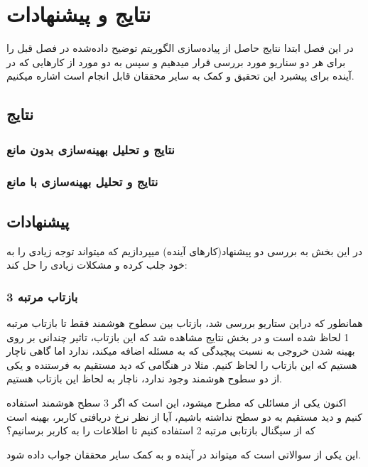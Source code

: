 \chapter{نتایج و پیشنهادات}
در این فصل ابتدا نتایج حاصل از پیاده‌سازی الگوریتم توضیح داده‌شده در فصل قبل را برای هر دو سناریو مورد بررسی قرار میدهیم و سپس به دو مورد از کارهایی که در آینده برای پیشبرد این تحقیق و کمک به سایر محققان قابل انجام است اشاره میکنیم.
\newpage
\section{نتایج}

\subsection{نتایج و تحلیل بهینه‌سازی بدون مانع}

\subsection{نتایج و تحلیل بهینه‌سازی با مانع}

\section{پیشنهادات}

در این بخش به بررسی دو پیشنهاد(کارهای آینده) میپردازیم که میتواند توجه زیادی را به خود جلب کرده و مشکلات زیادی را حل کند:

\subsection{بازتاب مرتبه 3}

همانطور که دراین ستاریو بررسی شد، بازتاب بین سطوح هوشمند فقط تا بازتاب مرتبه 1 لحاظ شده است و در بخش نتایج مشاهده شد که این بازتاب، تاثیر چندانی بر روی بهینه شدن خروجی به نسبت پیچیدگی که به مسئله اضافه میکند، ندارد اما گاهی ناچار هستیم که این بازتاب را لحاظ کنیم. مثلا در هنگامی که دید مستقیم به فرستنده و یکی از دو سطوح هوشمند وجود ندارد، ناچار به لحاظ این بازتاب هستیم. 

اکنون یکی از مسائلی که مطرح میشود، این است که اگر 3 سطح هوشمند استفاده کنیم و دید مستقیم به دو سطح نداشته باشیم، آیا از نظر  نرخ دریافتی کاربر، بهینه است که از سیگنال بازتابی مرتبه 2 استفاده کنیم تا اطلاعات را به کاربر برسانیم؟

این یکی از سوالاتی است که میتواند در آینده و به کمک سایر محققان جواب داده شود. 

